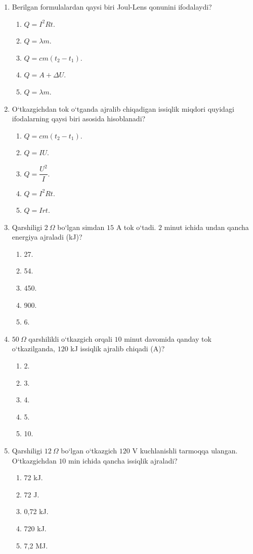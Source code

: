 \begin{enumerate}

\item Berilgan formulalardan qaysi biri Joul-Lens qonunini ifodalaydi?
\begin{enumerate}[label=\Alph*)]
\item $Q=I^2Rt$.
\item $Q=\lambda m$.
\item $Q=cm(t_2-t_1)$.
\item $Q=A+\Delta U$.
\item $Q=\lambda m$.
\end{enumerate}

\item O‘tkazgichdan tok o‘tganda ajralib chiqadigan issiqlik miqdori quyidagi ifodalarning qaysi biri asosida hisoblanadi?
\begin{enumerate}[label=\Alph*)]
\item $Q=cm(t_2-t_1)$.
\item $Q=IU$.
\item $Q=\dfrac{U^2}{I}$.
\item $Q=I^2Rt$.
\item $Q=Irt$.
\end{enumerate}

\item Qarshiligi $2~\Omega$ bo‘lgan simdan $15$ A tok o‘tadi. $2$ minut ichida undan qancha energiya ajraladi (kJ)?
\begin{enumerate}[label=\Alph*)]
\item 27.
\item 54.
\item 450.
\item 900.
\item 6.
\end{enumerate}

\item $50~\Omega$ qarshilikli o‘tkazgich orqali $10$ minut davomida qanday tok o‘tkazilganda, $120$ kJ issiqlik ajralib chiqadi (A)?
\begin{enumerate}[label=\Alph*)]
\item 2.
\item 3.
\item 4.
\item 5.
\item 10.
\end{enumerate}

\item Qarshiligi $12~\Omega$ bo‘lgan o‘tkazgich $120$ V kuchlanishli tarmoqqa ulangan. O‘tkazgichdan $10$ min ichida qancha issiqlik ajraladi?
\begin{enumerate}[label=\Alph*)]
\item 72 kJ.
\item 72 J.
\item 0,72 kJ.
\item 720 kJ.
\item 7,2 MJ.
\end{enumerate}


\end{enumerate}
